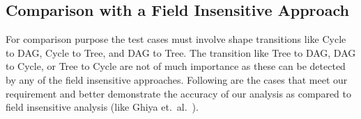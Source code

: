 \documentclass{sig-alternate}
\begin{document}
\subsection{Comparison with a Field Insensitive Approach}

For comparison purpose the test cases must involve shape
transitions like Cycle to DAG, Cycle to Tree, and DAG to
Tree. The transition like Tree to DAG, DAG to Cycle, or Tree
to Cycle are not of much importance as these can be detected
by any of the field insensitive approaches. Following are the
cases that meet our requirement and better demonstrate the
accuracy of our analysis as compared to field insensitive
analysis (like Ghiya et.~al.~\cite{Ghiya96}).

\newcommand{\on}{p} 
\newcommand{\nn}{r}
\end{document}
